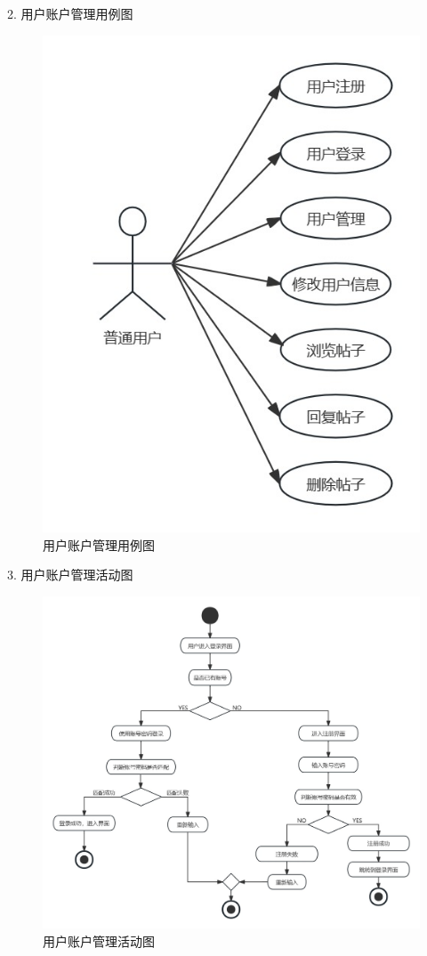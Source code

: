 \documentclass[UTF8]{ctexart}
\begin{document}
2. 用户账户管理用例图
\begin{figure}[H]
  \centering
  \includegraphics[scale=0.3]{用例图/普通用户用例图.jpg}
  \caption{用户账户管理用例图}
\end{figure}

3. 用户账户管理活动图
\begin{figure}[H]
  \centering
  \includegraphics[scale=0.25]{活动图/用户账户管理活动图.jpg}
  \caption{用户账户管理活动图}
\end{figure}
\end{document}
